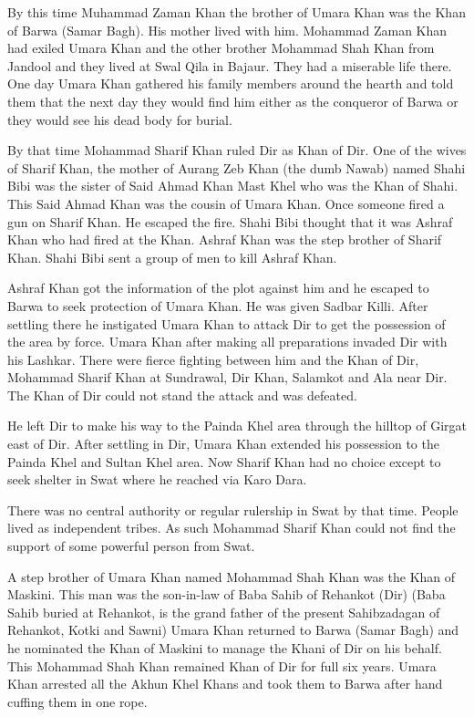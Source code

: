 \documentclass[twoside,openright]{book}
\begin{document}
By this time Muhammad Zaman Khan the brother of Umara Khan was the Khan of Barwa
(Samar Bagh). His mother lived with him. Mohammad Zaman Khan had exiled Umara
Khan and the other brother Mohammad Shah Khan from Jandool and they lived at
Swal Qila in Bajaur. They had a miserable life there. One day Umara Khan
gathered his family members around the hearth and told them that the next day
they would find him either as the conqueror of Barwa or they would see his dead
body for burial.

By that time Mohammad Sharif Khan ruled Dir as Khan of Dir. One of the wives of
Sharif Khan, the mother of Aurang Zeb Khan (the dumb Nawab) named Shahi Bibi was
the sister of Said Ahmad Khan Mast Khel who was the Khan of Shahi. This Said
Ahmad Khan was the cousin of Umara Khan. Once someone fired a gun on Sharif
Khan. He escaped the fire. Shahi Bibi thought that it was Ashraf Khan who had
fired at the Khan. Ashraf Khan was the step brother of Sharif Khan. Shahi Bibi
sent a group of men to kill Ashraf Khan.

Ashraf Khan got the information of the plot against him and he escaped to Barwa
to seek protection of Umara Khan. He was given Sadbar Killi. After settling
there he instigated Umara Khan to attack Dir to get the possession of the area
by force. Umara Khan after making all preparations invaded Dir with his Lashkar.
There were fierce fighting between him and the Khan of Dir, Mohammad Sharif Khan
at Sundrawal, Dir Khan, Salamkot and Ala near Dir. The Khan of Dir could not
stand the attack and was defeated.

He left Dir to make his way to the Painda Khel area through the hilltop of
Girgat east of Dir. After settling in Dir, Umara Khan extended his possession to
the Painda Khel and Sultan Khel area. Now Sharif Khan had no choice except to
seek shelter in Swat where he reached via Karo Dara.

There was no central authority or regular rulership in Swat by that time. People
lived as independent tribes. As such Mohammad Sharif Khan could not find the
support of some powerful person from Swat.

A step brother of Umara Khan named Mohammad Shah Khan was the Khan of Maskini.
This man was the son-in-law of Baba Sahib of Rehankot (Dir) (Baba Sahib buried
at Rehankot, is the grand father of the present Sahibzadagan of Rehankot, Kotki
and Sawni) Umara Khan returned to Barwa (Samar Bagh) and he nominated the Khan
of Maskini to manage the Khani of Dir on his behalf. This Mohammad Shah Khan
remained Khan of Dir for full six years. Umara Khan arrested all the Akhun Khel
Khans and took them to Barwa after hand cuffing them in one rope.
\end{document}
